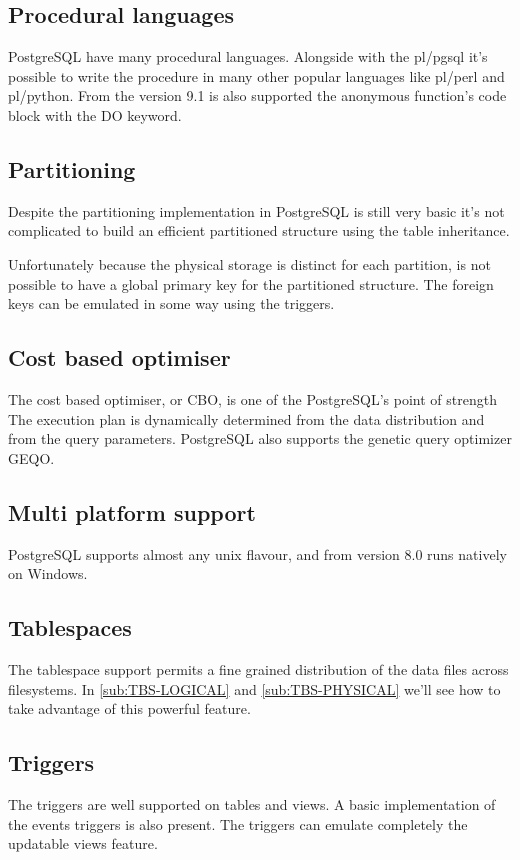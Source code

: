 \subsection{Procedural languages}
PostgreSQL have many procedural languages. Alongside with the pl/pgsql it's possible to write the 
procedure in many other popular languages like pl/perl and pl/python. From the version 9.1 is also 
supported the anonymous function's code block with the DO keyword.

\subsection{Partitioning}
Despite the partitioning implementation in
PostgreSQL is still very basic it's not complicated to build an efficient partitioned structure 
using 
the table inheritance.\newline

Unfortunately because the physical storage is distinct for each partition, is not possible to 
have a global primary key for the partitioned structure. The foreign keys can be emulated in some 
way using the triggers.

\subsection{Cost based optimiser}
The cost based optimiser, or CBO, is one of the PostgreSQL's 
point of strength The execution plan is dynamically determined from the data distribution and from 
the query parameters. PostgreSQL also supports the genetic query optimizer GEQO.


\subsection{Multi platform support}
PostgreSQL supports almost any unix flavour, and from version 8.0 runs natively on 
Windows.

\subsection{Tablespaces}
The tablespace support permits a fine grained distribution of the data files across
filesystems. In \ref{sub:TBS-LOGICAL} and \ref{sub:TBS-PHYSICAL} we'll see how to take advantage of 
this powerful feature.

\subsection{Triggers} 
The triggers are well supported on tables and views. A basic implementation of the events 
triggers is also present. The triggers can emulate completely the updatable views feature. 


